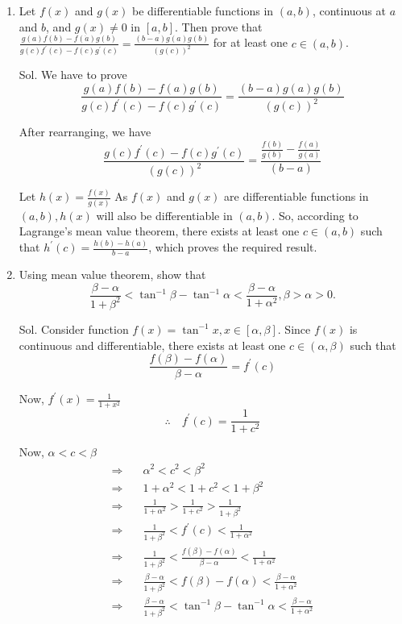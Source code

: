 \begin{enumerate}
    \item Let $f(x)$ and $g(x)$ be differentiable functions in $(a, b)$, continuous at $a$ and $b$, and $g(x) \neq 0$ in $[a, b]$. Then prove that $\frac{g(a) f(b)-f(\dot{a}) g(b)}{g(c) f^{\prime}(c)-f(c) g^{\prime}(c)}=\frac{(b-a) g(a) g(b)}{(g(c))^2}$ for at least one $c \in(a, b)$.

Sol. We have to prove
$$
\frac{g(a) f(b)-f(a) g(b)}{g(c) f^{\prime}(c)-f(c) g^{\prime}(c)}=\frac{(b-a) g(a) g(b)}{(g(c))^2}
$$

After rearranging, we have
$$
\frac{g(c) f^{\prime}(c)-f(c) g^{\prime}(c)}{(g(c))^2}=\frac{\frac{f(b)}{g(b)}-\frac{f(a)}{g(a)}}{(b-a)}
$$

Let $h(x)=\frac{f(x)}{g(x)}$
As $f(x)$ and $g(x)$ are differentiable functions in $(a, b), h(x)$ will also be differentiable in $(a, b)$.
So, according to Lagrange's mean value theorem, there exists at least one $c \in(a, b)$ such that $h^{\prime}(c)=\frac{h(b)-h(a)}{b-a}$, which proves the required result.

\item 
Using mean value theorem, show that
$$
\frac{\beta-\alpha}{1+\beta^2}<\tan ^{-1} \beta-\tan ^{-1} \alpha<\frac{\beta-\alpha}{1+\alpha^2}, \beta>\alpha>0 .
$$

Sol. Consider function $f(x)=\tan ^{-1} x, x \in[\alpha, \beta]$.
Since $f(x)$ is continuous and differentiable, there exists at least one $c \in(\alpha, \beta)$ such that
$$
\frac{f(\beta)-f(\alpha)}{\beta-\alpha}=f^{\prime}(c)
$$

Now, $f^{\prime}(x)=\frac{1}{1+x^2}$
$$
\therefore \quad f^{\prime}(c)=\frac{1}{1+c^2}
$$

Now, $\alpha<c<\beta$
$$
\begin{array}{ll}
\Rightarrow \quad & \alpha^2<c^2<\beta^2 \\
\Rightarrow & 1+\alpha^2<1+c^2<1+\beta^2 \\
\Rightarrow & \frac{1}{1+\alpha^2}>\frac{1}{1+c^2}>\frac{1}{1+\beta^2} \\
\Rightarrow & \frac{1}{1+\beta^2}<f^{\prime}(c)<\frac{1}{1+\alpha^2} \\
\Rightarrow \quad & \frac{1}{1+\beta^2}<\frac{f(\beta)-f(\alpha)}{\beta-\alpha}<\frac{1}{1+\alpha^2} \\
\Rightarrow \quad & \frac{\beta-\alpha}{1+\beta^2}<f(\beta)-f(\alpha)<\frac{\beta-\alpha}{1+\alpha^2} \\
\Rightarrow \quad & \frac{\beta-\alpha}{1+\beta^2}<\tan ^{-1} \beta-\tan ^{-1} \alpha<\frac{\beta-\alpha}{1+\alpha^2}
\end{array}
$$
\end{enumerate}


